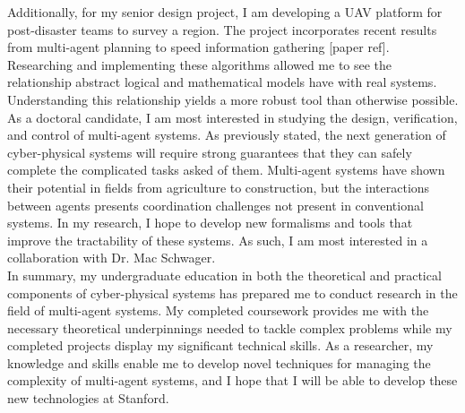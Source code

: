 \documentclass[]{article}
\begin{document}
Additionally, for my senior design project, I am developing a UAV platform for post-disaster teams to survey a region. The project incorporates recent results from multi-agent planning to speed information gathering [paper ref].  Researching and implementing these algorithms allowed me to see the relationship abstract logical and mathematical models have with real systems. Understanding this relationship yields a more robust tool than otherwise possible.\\

As a doctoral candidate, I am most interested in studying the design, verification, and control of multi-agent systems. As previously stated, the next generation of cyber-physical systems will require strong guarantees that they can safely complete the complicated tasks asked of them. Multi-agent systems have shown their potential in fields from agriculture to construction, but the interactions between agents presents coordination challenges not present in conventional systems. In my research, I hope to develop new formalisms and tools that improve the tractability of these systems. As such, I am most interested in a collaboration with Dr. Mac Schwager.\\

In summary, my undergraduate education in both the theoretical and practical components of cyber-physical systems has prepared me to conduct research in the field of multi-agent systems. My completed coursework provides me with the necessary theoretical underpinnings needed to tackle complex problems while my completed projects display my significant technical skills. As a researcher, my knowledge and skills enable me to develop novel techniques for managing the complexity of multi-agent systems, and I hope that I will be able to develop these new technologies at Stanford.
\begin{comment}
	As part of my embedded systems course work, I developed Protodive -- a hardware-in-the-loop testing platform for hybrid electric vehicle power supplies. Developing smart control algorithms these supplies is difficult because applying current in the wrong way to full scale motors can cause serious damage. This device is a scaled model of a battery-capacitor supply that a developer can safely keep on his desk to speed testing and development.
\end{comment}

\pagebreak
\end{document}
